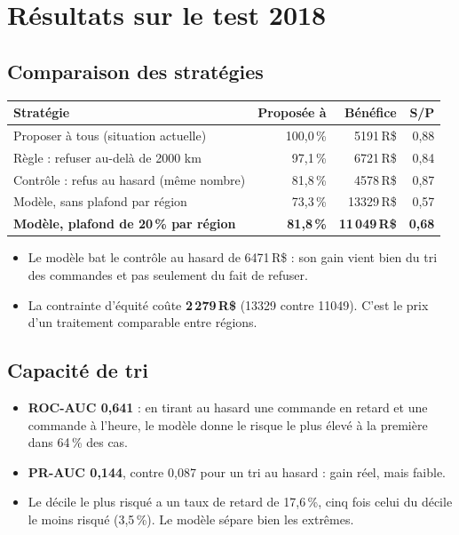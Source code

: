 \documentclass[11pt,a4paper]{article}
\newcommand{\RS}{\,R\$}
\begin{document}
\section{Résultats sur le test 2018}

\subsection{Comparaison des stratégies}

\begin{center}
\begin{tabular}{@{}lrrr@{}}
\toprule
Stratégie & Proposée à & Bénéfice & S/P \\
\midrule
Proposer à tous (situation actuelle) & 100,0\,\% & \num{5191}\RS{} & 0,88 \\
Règle : refuser au-delà de \num{2000} km & 97,1\,\% & \num{6721}\RS{} & 0,84 \\
Contrôle : refus au hasard (même nombre) & 81,8\,\% & \num{4578}\RS{} & 0,87 \\
Modèle, sans plafond par région & 73,3\,\% & \num{13329}\RS{} & 0,57 \\
\textbf{Modèle, plafond de 20\,\% par région} & \textbf{81,8\,\%} & \textbf{11\,049\RS} & \textbf{0,68} \\
\bottomrule
\end{tabular}
\end{center}

\begin{itemize}
  \item Le modèle bat le contrôle au hasard de \num{6471}\RS{} : son gain vient bien du tri des
        commandes et pas seulement du fait de refuser.
  \item La contrainte d'équité coûte \textbf{2\,279\RS} (\num{13329} contre
        \num{11049}). C'est le prix d'un traitement comparable entre régions.
\end{itemize}

\subsection{Capacité de tri}

\begin{itemize}
  \item \textbf{ROC-AUC 0,641} : en tirant au hasard une commande en retard et une commande à
        l'heure, le modèle donne le risque le plus élevé à la première dans 64\,\% des cas.
  \item \textbf{PR-AUC 0,144}, contre 0,087 pour un tri au hasard : gain réel, mais faible.
  \item Le décile le plus risqué a un taux de retard de 17,6\,\%, cinq fois celui du décile le
        moins risqué (3,5\,\%). Le modèle sépare bien les extrêmes.
\end{itemize}
\end{document}
